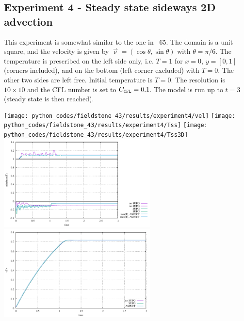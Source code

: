 \newpage
\subsection*{Experiment 4 - Steady state sideways 2D advection}

This experiment is somewhat similar to the one in \stone~65.
The domain is a unit square, and the velocity is given 
by $\vec\upnu=(\cos \theta, \sin\theta)$ with $\theta=\pi/6$.
The temperature is prescribed on the left side only, i.e. $T=1$ for $x=0$, $y=[0,1]$ 
(corners included), and 
on the bottom (left corner excluded) with $T=0$. The other two sides 
are left free. Initial temperature is $T=0$.
The resolution is $10\times10$ and the CFL number is set to $C_{\tt CFL}=0.1$. 
The model is run up to $t=3$ (steady state is then reached). 

\begin{center}
\texttt{[image: python\_codes/fieldstone\_43/results/experiment4/vel]}
\texttt{[image: python\_codes/fieldstone\_43/results/experiment4/Tss]}
\texttt{[image: python\_codes/fieldstone\_43/results/experiment4/Tss3D]}\\
\includegraphics[width=8cm]{python_codes/fieldstone_43/results/experiment4/stats_T}
\includegraphics[width=8cm]{python_codes/fieldstone_43/results/experiment4/avrg_T}
\end{center}

\newpage
